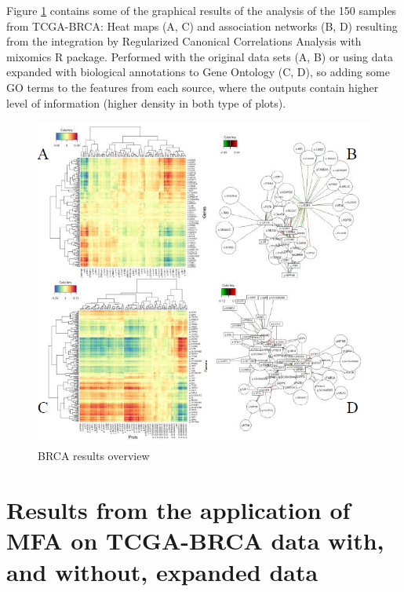 \documentclass[a4paper, nobind]{templates/ociamthesis}
\begin{document}
Figure \ref{fig:fig4-2} contains some of the graphical results of the analysis of the 150 samples from TCGA-BRCA: Heat maps (A, C) and association networks (B, D) resulting from the integration by Regularized Canonical Correlations Analysis with mixomics R package. Performed with the original data sets (A, B) or using data expanded with biological annotations to Gene Ontology (C, D), so adding some GO terms to the features from each source, where the outputs contain higher level of information (higher density in both type of plots).

\begin{figure}

{\centering \includegraphics[width=0.95\linewidth]{figures/chapter4/4-2_BRCA_results_overview} 

}

\caption{BRCA results overview}\label{fig:fig4-2}
\end{figure}

\hypertarget{results-from-the-application-of-mfa-on-tcga-brca-data-with-and-without-expanded-data}{%
\section{Results from the application of MFA on TCGA-BRCA data with, and without, expanded data}\label{results-from-the-application-of-mfa-on-tcga-brca-data-with-and-without-expanded-data}}
\end{document}
